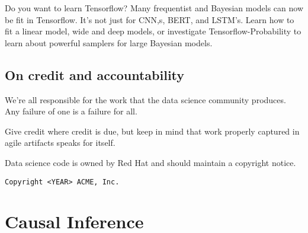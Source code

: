 \documentclass[
  11pt,
]{book}
\begin{document}
Do you want to learn Tensorflow? Many frequentist and Bayesian models can now be fit in Tensorflow. It's not just for CNN,s, BERT, and LSTM's. Learn how to fit a linear model, wide and deep models, or investigate Tensorflow-Probability to learn about powerful samplers for large Bayesian models.

\hypertarget{on-credit-and-accountability}{%
\subsection{On credit and accountability}\label{on-credit-and-accountability}}

We're all responsible for the work that the data science community produces. Any failure of one is a failure for all.

Give credit where credit is due, but keep in mind that work properly captured in agile artifacts speaks for itself.

Data science code is owned by Red Hat and should maintain a copyright notice.

\texttt{Copyright\ \textless{}YEAR\textgreater{}\ ACME,\ Inc.}

\hypertarget{causal-inference}{%
\section{Causal Inference}\label{causal-inference}}
\end{document}
